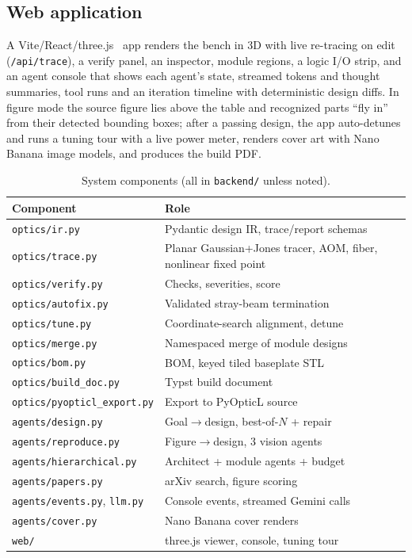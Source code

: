\documentclass[10pt,twocolumn,letterpaper]{article}
\newcommand{\code}[1]{\texttt{\small #1}}
\begin{document}
\subsection{Web application}
A Vite/React/three.js~\cite{threejs} app renders the bench in 3D with live re-tracing on edit (\code{/api/trace}), a verify panel, an inspector, module regions, a logic I/O strip, and an agent console that shows each agent's state, streamed tokens and thought summaries, tool runs and an iteration timeline with deterministic design diffs. In figure mode the source figure lies above the table and recognized parts ``fly in'' from their detected bounding boxes; after a passing design, the app auto-detunes and runs a tuning tour with a live power meter, renders cover art with Nano Banana image models, and produces the build PDF.

\begin{table}[t]
\centering\small
\caption{System components (all in \code{backend/} unless noted).}
\label{tab:components}
\footnotesize
\begin{tabularx}{\linewidth}{@{}lX@{}}
\toprule
Component & Role \\
\midrule
\code{optics/ir.py} & Pydantic design IR, trace/report schemas \\
\code{optics/trace.py} & Planar Gaussian+Jones tracer, AOM, fiber, nonlinear fixed point \\
\code{optics/verify.py} & Checks, severities, score \\
\code{optics/autofix.py} & Validated stray-beam termination \\
\code{optics/tune.py} & Coordinate-search alignment, detune \\
\code{optics/merge.py} & Namespaced merge of module designs \\
\code{optics/bom.py} & BOM, keyed tiled baseplate STL \\
\code{optics/build\_doc.py} & Typst build document \\
\code{optics/pyopticl\_export.py} & Export to PyOpticL source \\
\code{agents/design.py} & Goal$\to$design, best-of-$N$ + repair \\
\code{agents/reproduce.py} & Figure$\to$design, 3 vision agents \\
\code{agents/hierarchical.py} & Architect + module agents + budget \\
\code{agents/papers.py} & arXiv search, figure scoring \\
\code{agents/events.py}, \code{llm.py} & Console events, streamed Gemini calls \\
\code{agents/cover.py} & Nano Banana cover renders \\
\code{web/} & three.js viewer, console, tuning tour \\
\bottomrule
\end{tabularx}
\end{table}
\end{document}
